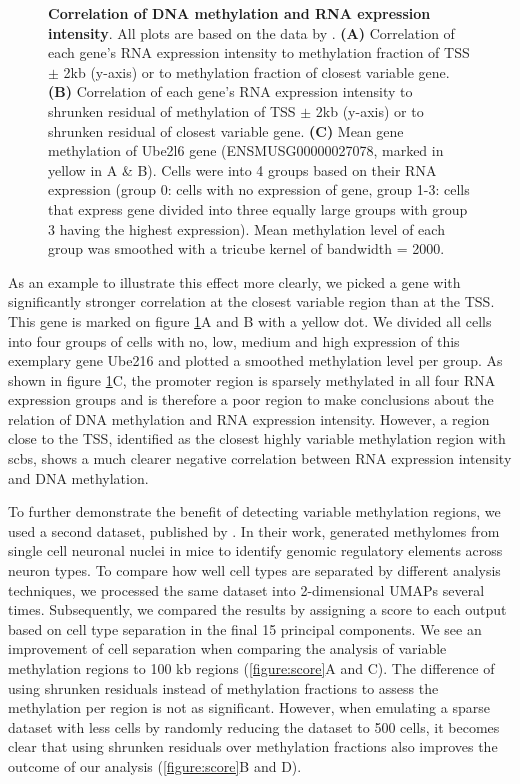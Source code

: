 \documentclass[twocolumn,10pt]{article}
\begin{document}
\begin{figure}[!htp]
	\caption{\small \textbf{Correlation of DNA methylation and RNA expression intensity}. All plots are based on the data by \citealp{Argelaguet_2019}.
	\textbf{(A)} Correlation of each gene's RNA expression intensity to methylation fraction of TSS $\pm$ 2kb (y-axis) or to methylation fraction of closest variable gene.
	\textbf{(B)} Correlation of each gene's RNA expression intensity to shrunken residual of methylation of TSS $\pm$ 2kb (y-axis) or to shrunken residual of closest variable gene.
	\textbf{(C)} Mean gene methylation of Ube2l6 gene (ENSMUSG00000027078, marked in yellow in A \& B). Cells were into 4 groups based on their RNA expression (group 0: cells with no expression of gene, group 1-3: cells that express gene divided into three equally large groups with group 3 having the highest expression). Mean methylation level of each group was smoothed with a tricube kernel of bandwidth = 2000.}
	\label{figure:correlation}
\end{figure}

As an example to illustrate this effect more clearly, we picked a gene with significantly stronger correlation at the closest variable region than at the TSS. This gene is marked on figure \ref{figure:correlation}A and B with a yellow dot. We divided all cells into four groups of cells with no, low, medium and high expression of this exemplary gene Ube216 and plotted a smoothed methylation level per group. As shown in figure \ref{figure:correlation}C, the promoter region is sparsely methylated in all four RNA expression groups and is therefore a poor region to make conclusions about the relation of DNA methylation and RNA expression intensity. However, a region close to the TSS, identified as the closest highly variable methylation region with scbs, shows a much clearer negative correlation between RNA expression intensity and DNA methylation.  


To further demonstrate the benefit of detecting variable methylation regions, we used a second dataset, published by \citealp{luo2017single}. In their work, \citealp{luo2017single} generated methylomes from single cell neuronal nuclei in mice to identify genomic regulatory elements across neuron types. To compare how well cell types are separated by different analysis techniques, we processed the same dataset into 2-dimensional UMAPs several times. Subsequently, we compared the results by assigning a score to each output based on cell type separation in the final 15 principal components. We see an improvement of cell separation when comparing the analysis of variable methylation regions to 100 kb regions (\ref{figure:score}A and C). The difference of using shrunken residuals instead of methylation fractions to assess the methylation per region is not as significant. However, when emulating a sparse dataset with less cells by randomly reducing the dataset to 500 cells, it becomes clear that using shrunken residuals over methylation fractions also improves the outcome of our analysis (\ref{figure:score}B and D). 
\end{document}
